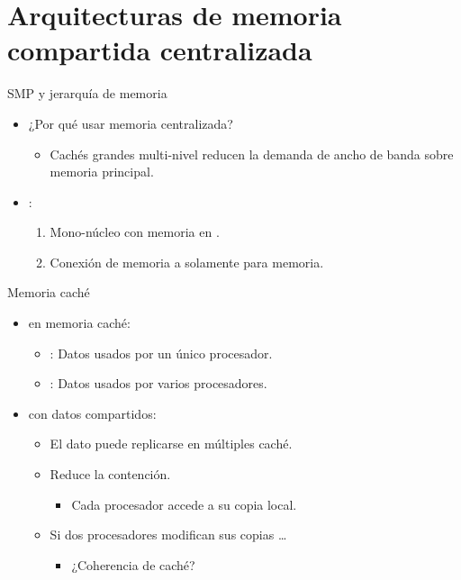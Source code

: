 \section{Arquitecturas de memoria compartida centralizada}

\begin{frame}[t]{SMP y jerarquía de memoria}
\begin{itemize}
  \item ¿Por qué usar memoria centralizada?
    \begin{itemize}
      \item Cachés grandes multi-nivel reducen la demanda de ancho
            de banda sobre memoria principal.
    \end{itemize}

  \item {}:
    \begin{enumerate}[1.]
      \item Mono-núcleo con memoria en .
      \item Conexión de memoria a  solamente para memoria.
    \end{enumerate}
\end{itemize}
\end{frame}

\begin{frame}[t]{Memoria caché}
\begin{itemize}
  \item {} en memoria caché:
    \begin{itemize}
      \item {}: Datos usados por un único procesador.
      \item {}: Datos usados por varios procesadores.
    \end{itemize}

  \item {} con datos compartidos:
    \begin{itemize}
      \item \pause El dato puede replicarse en múltiples caché.
      \item \pause Reduce la contención.
        \begin{itemize}
          \item Cada procesador accede a su copia local.
        \end{itemize}
      \item \pause Si dos procesadores modifican sus copias \ldots
        \begin{itemize}
          \item ¿Coherencia de caché?
        \end{itemize}
    \end{itemize}
\end{itemize}
\end{frame}

